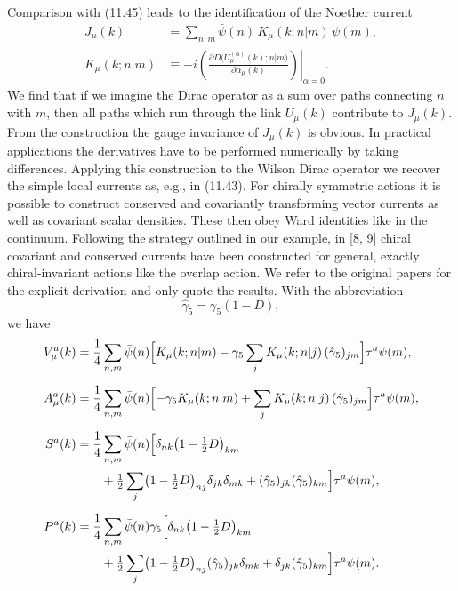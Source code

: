 Comparison with (11.45) leads to the identification of the Noether current
\begin{equation}
\begin{aligned}
J_\mu(k) &= \sum_{n,m} \bar{\psi}(n)\, K_\mu(k; n|m)\, \psi(m) , \\
K_\mu(k; n|m) &\equiv -i
\left.\left(\frac{\partial D\bigl(U_\mu^{(\alpha)}(k); n|m\bigr)}
{\partial\alpha_\mu(k)}\right)\right|_{\alpha=0} .
\end{aligned}
\end{equation}
We find that if we imagine the Dirac operator as a sum over paths connecting
$n$ with $m$, then all paths which run through the link $U_\mu(k)$ contribute to
$J_\mu(k)$. From the construction the gauge invariance of $J_\mu(k)$ is obvious. In
practical applications the derivatives have to be performed numerically by
taking differences. Applying this construction to the Wilson Dirac operator
we recover the simple local currents as, e.g., in (11.43).
For chirally symmetric actions it is possible to construct conserved and
covariantly transforming vector currents as well as covariant scalar densities.
These then obey Ward identities like in the continuum.
Following the strategy outlined in our example, in [8, 9] chiral covariant
and conserved currents have been constructed for general, exactly
chiral-invariant actions like the overlap action. We refer to the original papers
for the explicit derivation and only quote the results. With the abbreviation
\begin{equation}
\hat{\gamma}_5 = \gamma_5 (1 - D) ,
\end{equation}
we have
\begin{equation}
\begin{aligned}
V_\mu^a(k) &=
\frac{1}{4}\sum_{n,m} \bar{\psi}(n)\Bigl[K_\mu(k; n|m)
- \gamma_5\sum_j K_\mu(k; n|j)\,(\hat{\gamma}_5)_{jm}\Bigr]\tau^a\psi(m) , \\[2mm]
A_\mu^a(k) &=
\frac{1}{4}\sum_{n,m} \bar{\psi}(n)\Bigl[-\gamma_5 K_\mu(k; n|m)
+ \sum_j K_\mu(k; n|j)\,(\hat{\gamma}_5)_{jm}\Bigr]\tau^a\psi(m) , \\[2mm]
S^a(k) &=
\frac{1}{4}\sum_{n,m} \bar{\psi}(n)\Bigl[\delta_{nk}\bigl(1 - \tfrac{1}{2} D\bigr)_{km}\\
&\qquad + \tfrac{1}{2}\sum_j \bigl(1 - \tfrac{1}{2} D\bigr)_{nj}\delta_{jk}\delta_{mk}
+ (\hat{\gamma}_5)_{jk}(\hat{\gamma}_5)_{km}\Bigr]\tau^a\psi(m) , \\[2mm]
P^a(k) &=
\frac{1}{4}\sum_{n,m} \bar{\psi}(n)\gamma_5\Bigl[\delta_{nk}\bigl(1 - \tfrac{1}{2} D\bigr)_{km}\\
&\qquad + \tfrac{1}{2}\sum_j \bigl(1 - \tfrac{1}{2} D\bigr)_{nj}(\hat{\gamma}_5)_{jk}\delta_{mk}
+ \delta_{jk}(\hat{\gamma}_5)_{km}\Bigr]\tau^a\psi(m) .
\end{aligned}
\end{equation}
